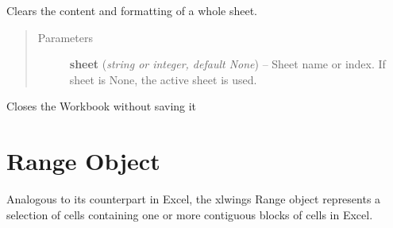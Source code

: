\documentclass[letterpaper,11pt,english]{sphinxmanual}
\begin{document}
\begin{fulllineitems}
\begin{fulllineitems}
\begin{quote}
\begin{description}
\end{description}\end{quote}

\end{fulllineitems}


\begin{fulllineitems}
\label{workbook:xlwings.Workbook.clear}
Clears the content and formatting of a whole sheet.
\begin{quote}\begin{description}
\item[{Parameters}] \leavevmode
\textbf{sheet} (\emph{string or integer, default None}) -- Sheet name or index. If sheet is None, the active sheet is used.

\end{description}\end{quote}

\end{fulllineitems}


\begin{fulllineitems}
\label{workbook:xlwings.Workbook.close}
Closes the Workbook without saving it

\end{fulllineitems}


\end{fulllineitems}



\chapter{Range Object}
\label{range:range-object}\label{range::doc}
Analogous to its counterpart in Excel, the xlwings Range object represents a selection of cells containing one or more
contiguous blocks of cells in Excel.
\label{range:module-xlwings}
\end{document}
